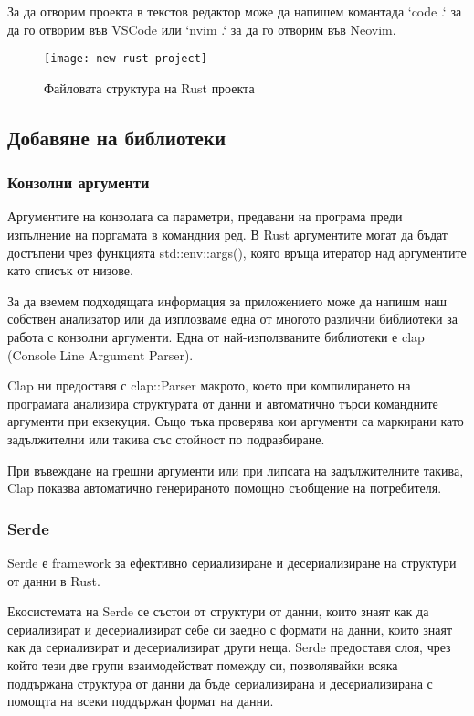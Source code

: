 За да отворим проекта в текстов редактор може да напишем комантада `code .` за
да го отворим във VSCode или `nvim .` за да го отворим във Neovim.
 
\begin{figure}[!htb]
  \texttt{[image: new-rust-project]}
  \centering
  \caption{Файловата структура на Rust проекта}
  \label{fig:new-rust-project}
\end{figure}

\subsection{Добавяне на библиотеки}

\subsubsection{Конзолни аргументи}
Аргументите на конзолата са параметри, предавани на програма преди изпълнение
на поргамата в командния ред. В Rust аргументите могат да бъдат достъпени чрез
функцията std::env::args(), която връща итератор над аргументите като списък от
низове.

За да вземем подходящата информация за приложението може да напишм наш собствен
анализатор или да изплозваме една от многото различни библиотеки за работа с
конзолни аргументи. Една от най-използваните библиотеки е clap (Console Line
Argument Parser).

Clap ни предоставя с clap::Parser макрото, което при компилирането на програмата
анализира структурата от данни и автоматично търси командните аргументи при екзекуция.
Също тъка проверява кои аргументи са маркирани като задължителни или такива със
стойност по подразбиране.

При въвеждане на грешни аргументи или при липсата на задължителните такива, Clap
показва автоматично генерираното помощно съобщение на потребителя.


\subsubsection{Serde}
Serde е framework за ефективно сериализиране и десериализиране на структури от данни в Rust.

Екосистемата на Serde се състои от структури от данни, които знаят как да
сериализират и десериализират себе си заедно с формати на данни, които знаят
как да сериализират и десериализират други неща. Serde предоставя слоя, чрез
който тези две групи взаимодействат помежду си, позволявайки всяка поддържана
структура от данни да бъде сериализирана и десериализирана с помощта на всеки
поддържан формат на данни.

